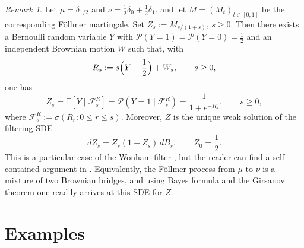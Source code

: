 \documentclass[reqno, a4paper]{amsart}
\newcommand{\F}{\mathcal F}
\theoremstyle{plain}
\theoremstyle{definition}
\theoremstyle{remark}
\newtheorem{remark}[theorem]{Remark}
\numberwithin{equation}{section}
\numberwithin{theorem}{section}
\newcommand{\E}{\mathbb{E}}
\newcommand{\MT}{\mathsf{MT}}
\renewcommand{\P}{\mathcal{P}}
\begin{document}
	
	\begin{remark}
		\label{prop:bernoulli_follmer_wf}
		Let \(\mu=\delta_{1/2}\) and \(\nu=\frac12\delta_0+\frac12\delta_1\), and let \(M=(M_t)_{t\in[0,1]}\) be the corresponding F\"ollmer martingale.
		Set
		$
		Z_s:=M_{s/(1+s)}, \,s\ge 0
		$. 
		Then there exists a Bernoulli random variable \(Y\) with \(\P(Y=1)=\P(Y=0)=\frac12\) and an independent Brownian motion \(W\) such that, with
		\[
		R_s:=s\Bigl(Y-\frac12\Bigr)+W_s, \qquad s\ge 0,
		\]
		one has
		\[
		Z_s=\E[Y\mid \F_s^R]=\P(Y=1\mid \F_s^R)=\frac{1}{1+e^{-R_s}}, \qquad s\ge 0,
		\]
		where \(\F_s^R:=\sigma(R_r:0\le r\le s)\).
		Moreover, \(Z\) is the unique weak solution of the filtering SDE
		\[
		dZ_s=Z_s(1-Z_s)\,dB_s, \qquad Z_0=\frac12.
		\]
		This is a particular case of the Wonham filter \cite{Wo64}, but the reader can find a self-contained argument in \cite[Proposition 5.2]{BaBeBiLe26v1}. Equivalently, the Föllmer process from $\mu$ to $\nu$ is a mixture of two Brownian bridges, and using Bayes formula and the Girsanov theorem one readily arrives at this SDE for $Z$.
	\end{remark}
	
	
	
	\section{Examples}\label{sec:examples}
	
	
	
\end{document}
